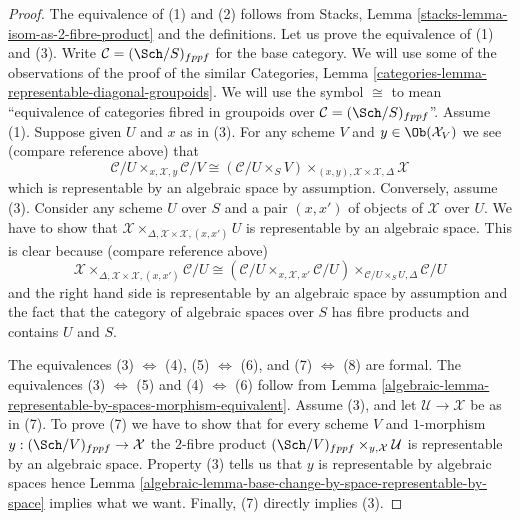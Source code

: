\begin{proof}

The equivalence of (1) and (2) follows from
Stacks, Lemma \ref{stacks-lemma-isom-as-2-fibre-product}
and the definitions.
Let us prove the equivalence of (1) and (3).
Write $\mathcal{C} = (\Sch/S)_{fppf}$ for the base category.
We will use some of the observations of the proof of the similar
Categories, Lemma \ref{categories-lemma-representable-diagonal-groupoids}.
We will use the symbol $\cong$ to mean ``equivalence of categories fibred
in groupoids over $\mathcal{C} = (\Sch/S)_{fppf}$''.
Assume (1). Suppose given $U$ and $x$ as in (3). For any scheme $V$
and $y \in \Ob(\mathcal{X}_V)$ we see (compare reference above) that
$$
\mathcal{C}/U
\times_{x, \mathcal{X}, y}
\mathcal{C}/V
\cong
(\mathcal{C}/U \times_S V)
\times_{(x, y), \mathcal{X} \times \mathcal{X}, \Delta}
\mathcal{X}
$$
which is representable by an algebraic space by assumption. Conversely,
assume (3). Consider any scheme $U$ over $S$ and a pair $(x, x')$
of objects of $\mathcal{X}$ over $U$. We have to show that
$\mathcal{X} \times_{\Delta, \mathcal{X} \times \mathcal{X}, (x, x')} U$
is representable by an algebraic space. This is clear because
(compare reference above)
$$
\mathcal{X}
\times_{\Delta, \mathcal{X} \times \mathcal{X}, (x, x')}
\mathcal{C}/U
\cong
(\mathcal{C}/U \times_{x, \mathcal{X}, x'} \mathcal{C}/U)
\times_{\mathcal{C}/U \times_S U, \Delta}
\mathcal{C}/U
$$
and the right hand side is representable by an algebraic space by assumption
and the fact that the category of algebraic spaces over $S$ has fibre products
and contains $U$ and $S$.

\medskip\noindent
The equivalences
(3) $\Leftrightarrow$ (4),
(5) $\Leftrightarrow$ (6),
and
(7) $\Leftrightarrow$ (8)
are formal. The equivalences
(3) $\Leftrightarrow$ (5) and
(4) $\Leftrightarrow$ (6)
follow from
Lemma \ref{algebraic-lemma-representable-by-spaces-morphism-equivalent}.
Assume (3), and let $\mathcal{U} \to \mathcal{X}$ be as in (7).
To prove (7) we have to show that for every scheme $V$ and $1$-morphism
$y : (\Sch/V)_{fppf} \to \mathcal{X}$ the $2$-fibre product
$(\Sch/V)_{fppf} \times_{y, \mathcal{X}} \mathcal{U}$
is representable by an algebraic space. Property (3) tells us
that $y$ is representable by algebraic spaces hence
Lemma \ref{algebraic-lemma-base-change-by-space-representable-by-space}
implies what we want. Finally, (7) directly implies (3).
\end{proof}

